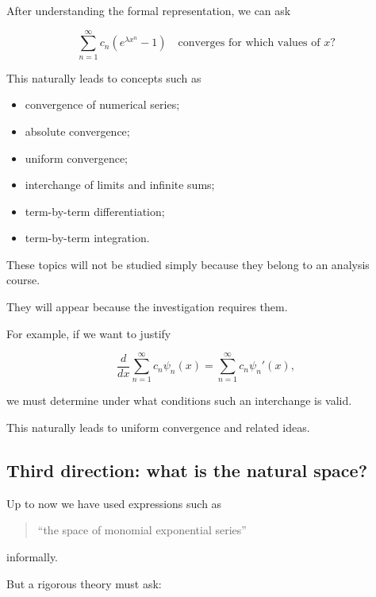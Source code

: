 After understanding the formal representation, we can ask

\[
\boxed{
\sum_{n=1}^{\infty}
c_n(e^{\lambda x^n}-1)
\quad
\text{converges for which values of }x?
}
\]

This naturally leads to concepts such as

\begin{itemize}

    \item convergence of numerical series;

    \item absolute convergence;

    \item uniform convergence;

    \item interchange of limits and infinite sums;

    \item term-by-term differentiation;

    \item term-by-term integration.

\end{itemize}

These topics will not be studied simply because they belong to an analysis
course.

They will appear because the investigation requires them.

For example, if we want to justify

\[
\frac{d}{dx}
\sum_{n=1}^{\infty}c_n\psi_n(x)
=
\sum_{n=1}^{\infty}
c_n\psi_n'(x),
\]

we must determine under what conditions such an interchange is valid.

This naturally leads to uniform convergence and related ideas.

\subsection{Third direction: what is the natural space?}

Up to now we have used expressions such as

\begin{quote}
``the space of monomial exponential series''
\end{quote}

informally.

But a rigorous theory must ask:

